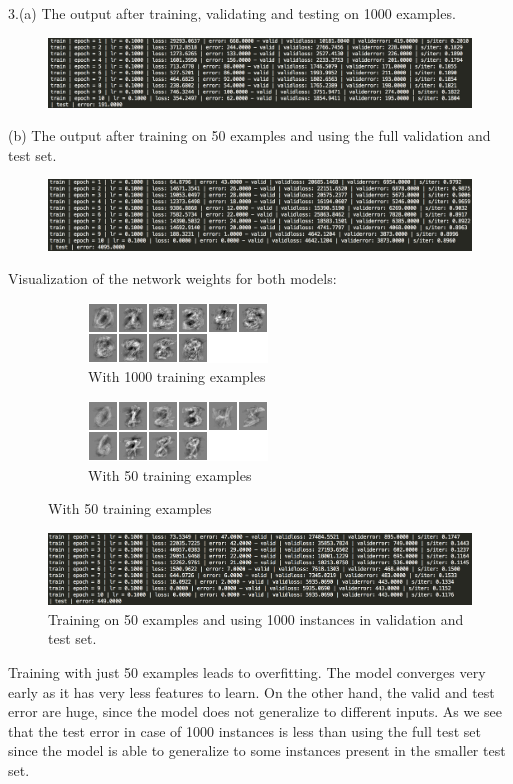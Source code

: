 \documentclass[11pt]{article}
\begin{document}
3.(a) The output after training, validating and testing on 1000 examples.
\begin{figure}[H]
\centering
\includegraphics[scale=0.5]{torch/output1000.png}
\caption{ \label{fig5}}
\end{figure}
(b) The output after training on 50 examples and using the full validation and test set.
\begin{figure}[H]
\centering
\includegraphics[scale=0.5]{torch/output50.png}
\caption{ \label{fig6}}
\end{figure}
Visualization of the network weights for both models:
\begin{figure}[H]
\begin{subfigure}{.5\textwidth}
\centering
\includegraphics{torch/weight_1000.png}
\caption{With 1000 training examples\label{fig3}}
\end{subfigure}
\begin{subfigure}{.5\textwidth}
\centering
\includegraphics{torch/weight_50.png}
\caption{With 50 training examples\label{fig4}}
\end{subfigure}
\end{figure}
\begin{figure}[H]
\centering
\includegraphics[scale=0.5]{torch/weight50-1000.png}
\caption{Training on 50 examples and using 1000 instances in validation and test set. \label{fig5}}
\end{figure}
Training with just 50 examples leads to overfitting. The model converges very early as it has very less features to learn. On the other hand, the valid and test error are huge, since the model does not generalize to different inputs. As we see that the test error in case of 1000 instances is less than using the full test set since the model is able to generalize to some instances present in the smaller test set.
\end{document}

